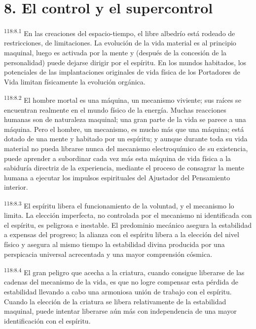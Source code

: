 \section*{8. El control y el supercontrol}
\par
\textsuperscript{118:8.1} En las creaciones del espacio-tiempo, el libre albedrío está rodeado de restricciones, de limitaciones. La evolución de la vida material es al principio maquinal, luego es activada por la mente y (después de la concesión de la personalidad) puede dejarse dirigir por el espíritu. En los mundos habitados, los potenciales de las implantaciones originales de vida física de los Portadores de Vida limitan físicamente la evolución orgánica.

\par
\textsuperscript{118:8.2} El hombre mortal es una máquina, un mecanismo viviente; sus raíces se encuentran realmente en el mundo físico de la energía. Muchas reacciones humanas son de naturaleza maquinal; una gran parte de la vida se parece a una máquina. Pero el hombre, un mecanismo, es mucho más que una máquina; está dotado de una mente y habitado por un espíritu; y aunque durante toda su vida material no pueda librarse nunca del mecanismo electroquímico de su existencia, puede aprender a subordinar cada vez más esta máquina de vida física a la sabiduría directriz de la experiencia, mediante el proceso de consagrar la mente humana a ejecutar los impulsos espirituales del Ajustador del Pensamiento interior.

\par
\textsuperscript{118:8.3} El espíritu libera el funcionamiento de la voluntad, y el mecanismo lo limita. La elección imperfecta, no controlada por el mecanismo ni identificada con el espíritu, es peligrosa e inestable. El predominio mecánico asegura la estabilidad a expensas del progreso; la alianza con el espíritu libera a la elección del nivel físico y asegura al mismo tiempo la estabilidad divina producida por una perspicacia universal acrecentada y una mayor comprensión cósmica.

\par
\textsuperscript{118:8.4} El gran peligro que acecha a la criatura, cuando consigue liberarse de las cadenas del mecanismo de la vida, es que no logre compensar esta pérdida de estabilidad llevando a cabo una armoniosa unión de trabajo con el espíritu. Cuando la elección de la criatura se libera relativamente de la estabilidad maquinal, puede intentar liberarse aún más con independencia de una mayor identificación con el espíritu.

